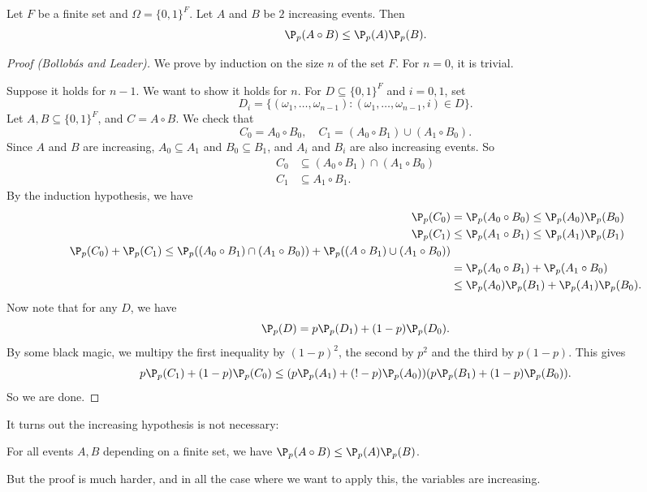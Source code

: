 \documentclass[a4paper]{article}
\begin{document}
\begin{thm}[BK inequality] %
  Let $F$ be a finite set and $\Omega = \{0, 1\}^F$. Let $A$ and $B$ be $2$ increasing events. Then
  \[
    \P_p(A \circ B) \leq \P_p(A) \P_p(B).
  \]
\end{thm}

\begin{proof}[Proof (Bollob\'as and Leader)]
  We prove by induction on the size $n$ of the set $F$. For $n = 0$, it is trivial.

  Suppose it holds for $n - 1$. We want to show it holds for $n$. For $D \subseteq \{0, 1\}^F$ and $i =0, 1$, set
  \[
    D_i = \{(\omega_1, \ldots, \omega_{n - 1}) : (\omega_1, \ldots, \omega_{n - 1}, i) \in D\}.
  \]
  Let $A, B \subseteq \{0, 1\}^F$, and $C = A \circ B$. We check that
  \[
    C_0 = A_0 \circ B_0,\quad C_1 = (A_0 \circ B_1) \cup (A_1 \circ B_0).
  \]
  Since $A$ and $B$ are increasing, $A_0 \subseteq A_1$ and $B_0 \subseteq B_1$, and $A_i$ and $B_i$ are also increasing events. So
  \begin{align*}
    C_0 &\subseteq (A_0 \circ B_1) \cap  (A_1 \circ B_0)\\
    C_1 &\subseteq A_1 \circ B_1.
  \end{align*}
  By the induction hypothesis, we have
  \begin{align*}
    \P_p(C_0) &= \P_p(A_0 \circ B_0) \leq \P_p(A_0) \P_p(B_0)\\
    \P_p(C_1) &\leq \P_p(A_1 \circ B_1) \leq \P_p(A_1) \P_p(B_1)\\
    \P_p(C_0) + \P_p(C_1) \leq \P_p((A_0 \circ B_1) \cap (A_1 \circ B_0)) + \P_p((A \circ B_1) \cup (A_1 \circ B_0))\\
    &= \P_p(A_0 \circ B_1) + \P_p(A_1 \circ B_0)\\
    &\leq \P_p(A_0) \P_p(B_1) + \P_p(A_1) \P_p(B_0).
  \end{align*}
  Now note that for any $D$, we have
  \[
    \P_p(D) = p \P_p(D_1) + (1 - p) \P_p(D_0).
  \]
  By some black magic, we multipy the first inequality by $(1 - p)^2$, the second by $p^2$ and the third by $p(1 - p)$. This gives
  \[
    p\P_p(C_1) + (1 - p)\P_p(C_0) \leq (p\P_p(A_1) + (!- p)\P_p(A_0))(p\P_p(B_1) + (1 - p) \P_p(B_0)).
  \]
  So we are done.
\end{proof}

It turns out the increasing hypothesis is not necessary:
\begin{thm}[Reimer]
  For all events $A, B$ depending on a finite set, we have $\P_p(A \circ B) \leq \P_p(A) \P_p(B)$.
\end{thm}
But the proof is much harder, and in all the case where we want to apply this, the variables are increasing.
\end{document}

